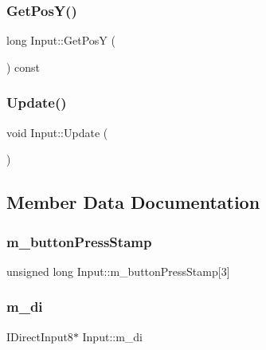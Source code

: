 \hypertarget{class_input_ac0e08246889f7ce5d765dbb4876ceeb2}{}\label{class_input_ac0e08246889f7ce5d765dbb4876ceeb2} 
\subsubsection{\texorpdfstring{Get\+Pos\+Y()}{GetPosY()}}
{\footnotesize\ttfamily long Input\+::\+Get\+PosY (\begin{DoxyParamCaption}{ }\end{DoxyParamCaption}) const}

\hypertarget{class_input_af80dcfde6dbfe39bf3bc0345c75595ce}{}\label{class_input_af80dcfde6dbfe39bf3bc0345c75595ce} 
\subsubsection{\texorpdfstring{Update()}{Update()}}
{\footnotesize\ttfamily void Input\+::\+Update (\begin{DoxyParamCaption}{ }\end{DoxyParamCaption})}



\subsection{Member Data Documentation}
\hypertarget{class_input_a9435776adeb594cd2b48e97aeda88231}{}\label{class_input_a9435776adeb594cd2b48e97aeda88231} 
\subsubsection{\texorpdfstring{m\+\_\+button\+Press\+Stamp}{m\_buttonPressStamp}}
{\footnotesize\ttfamily unsigned long Input\+::m\+\_\+button\+Press\+Stamp\mbox{[}3\mbox{]}\hspace{0.3cm}{\ttfamily [private]}}

\hypertarget{class_input_ade5b2cbf3dd9072d6c2c7466097c3679}{}\label{class_input_ade5b2cbf3dd9072d6c2c7466097c3679} 
\subsubsection{\texorpdfstring{m\+\_\+di}{m\_di}}
{\footnotesize\ttfamily I\+Direct\+Input8$\ast$ Input\+::m\+\_\+di\hspace{0.3cm}{\ttfamily [private]}}


